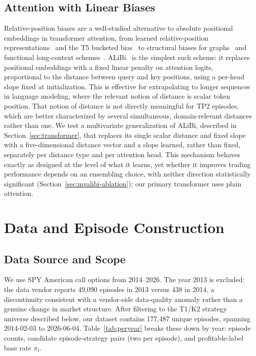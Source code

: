 \documentclass[sigconf,review]{acmart}
\begin{document}
\subsection{Attention with Linear Biases}
Relative-position biases are a well-studied alternative to absolute positional embeddings in transformer attention, from learned relative-position representations~\cite{shaw2018self} and the T5 bucketed bias~\cite{raffel2020t5} to structural biases for graphs~\cite{ying2021graphormer} and functional long-context schemes~\cite{li2024fire}. ALiBi~\cite{press2022alibi} is the simplest such scheme: it replaces positional embeddings with a fixed linear penalty on attention logits, proportional to the distance between query and key positions, using a per-head slope fixed at initialization. This is effective for extrapolating to longer sequences in language modeling, where the relevant notion of distance is scalar token position. That notion of distance is not directly meaningful for TP2 episodes, which are better characterized by several simultaneous, domain-relevant distances rather than one. We test a multivariate generalization of ALiBi, described in Section~\ref{sec:transformer}, that replaces its single scalar distance and fixed slope with a five-dimensional distance vector and a slope learned, rather than fixed, separately per distance type and per attention head. This mechanism behaves exactly as designed at the level of what it learns, yet whether it improves trading performance depends on an ensembling choice, with neither direction statistically significant (Section~\ref{sec:mvalibi-ablation}); our primary transformer uses plain attention.

\section{Data and Episode Construction}
\label{sec:data}

\subsection{Data Source and Scope}
\label{sec:data-source}
We use SPY American call options from 2014--2026. The year 2013 is excluded: the data vendor reports 49{,}090 episodes in 2013 versus 438 in 2014, a discontinuity consistent with a vendor-side data-quality anomaly rather than a genuine change in market structure. After filtering to the T1/K2 strategy universe described below, our dataset contains 177{,}487 unique episodes, spanning 2014-02-03 to 2026-06-04. Table~\ref{tab:peryear} breaks these down by year: episode counts, candidate episode-strategy pairs (two per episode), and profitable-label base rate $\pi_t$.
\end{document}
